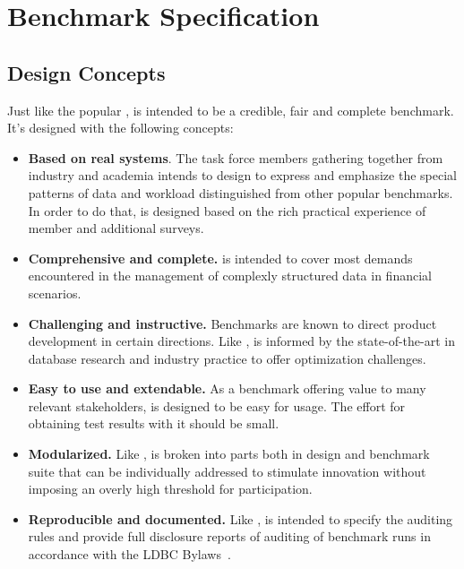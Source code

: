 \chapter{Benchmark Specification}
\label{sec:benchmark-specification}

\section{Design Concepts}

Just like the popular \ldbcsnb, \ldbcfinbench is intended to be a credible, fair
and complete benchmark. It's designed with the following concepts:

\begin{itemize}
      \item \textbf{Based on real systems}. The task force members gathering
            together from industry and academia intends to design \ldbcfinbench
            to express and emphasize the special patterns of data and workload
            distinguished from other popular benchmarks. In order to do that,
            \ldbcfinbench is designed based on the rich practical experience of
            member and additional surveys.
      \item \textbf{Comprehensive and complete.} \ldbcfinbench is intended to
            cover most demands encountered in the management of complexly
            structured data in financial scenarios.
      \item \textbf{Challenging and instructive.} Benchmarks are known to direct
            product development in certain directions. Like \ldbcsnb,
            \ldbcfinbench is informed by the state-of-the-art in database
            research and industry practice to offer optimization challenges.
      \item \textbf{Easy to use and extendable.} As a benchmark offering value
            to many relevant stakeholders, \ldbcfinbench is designed to be easy
            for usage. The effort for obtaining test results with it should be
            small.
      \item \textbf{Modularized.} Like \ldbcsnb, \ldbcfinbench is broken into
            parts both in design and benchmark suite that can be individually
            addressed to stimulate innovation without imposing an overly high
            threshold for participation.
      \item \textbf{Reproducible and documented.} Like \ldbcsnb, \ldbcfinbench
            is intended to specify the auditing rules and provide full
            disclosure reports of auditing of benchmark runs in accordance with
            the LDBC Bylaws~\cite{ldbc_byelaws}.
\end{itemize}

